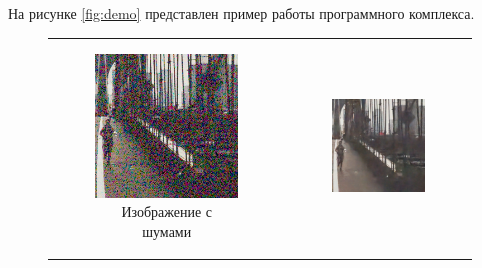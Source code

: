 На рисунке \ref{fig:demo} представлен пример работы программного комплекса.

\begin{figure}[h!]
  \centering
  \begin{tabular}{cc}
    \begin{subfigure}{0.45\textwidth}
      \includegraphics[width=\linewidth]{inc/demo/noised.png}
      \caption{Изображение с шумами}
    \end{subfigure} &
    \begin{subfigure}{0.45\textwidth}
      \includegraphics[width=\linewidth]{inc/demo/denoised_mycnn.png}

\end{subfigure}
\end{tabular}
\end{figure}

